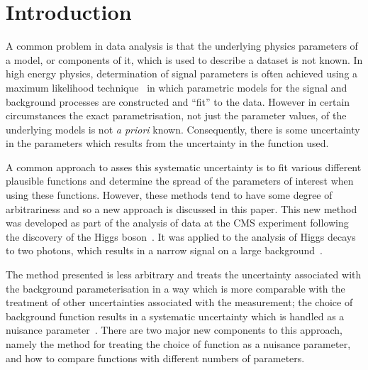 \section{Introduction} %
\label{sec:introduction}


A common problem in data analysis is that the underlying physics parameters of a model, or components of it, which is used to describe a dataset
is not known. In high energy physics, determination of signal parameters is
often achieved using a maximum likelihood technique~\cite{ref:Fisher01011922}
in which parametric models for the signal and background processes are constructed and
``fit'' to the data. However in certain circumstances the exact parametrisation, not just the parameter
values, of the underlying models is not {\it a priori} known. Consequently, there is some uncertainty in the parameters which results from the uncertainty in the function used.

A common approach to asses this systematic uncertainty is to fit various different plausible functions and
determine the spread of the parameters of interest when using these functions.
However, these methods tend to have some degree of arbitrariness and so
a new approach is discussed in this paper.
This new method was developed as part of the analysis of data at the CMS experiment
following the discovery of the Higgs
boson~\cite{ref:introduction:atlasdis,ref:introduction:cmsdis}.
It was applied to the analysis of Higgs decays to two photons, which
results in a narrow signal on a large
background~\cite{ref:introduction:legacy}.

The method presented is less
arbitrary and treats the uncertainty associated with the
background parameterisation in a way
which is more comparable with the treatment of other
uncertainties associated with the measurement; the choice of background
function results in a systematic uncertainty
which is handled as a nuisance parameter~\cite{ref:intro:nusiances}.
There are two major new components to this approach, namely the method for
treating the choice of function as a nuisance parameter, and how to compare
functions with different numbers of parameters.

